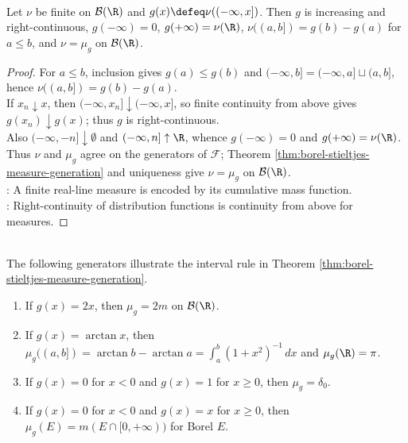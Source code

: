 \begin{proposition} \label{prop:finite-borel-measure-distribution-function} \\
Let $\nu$ be finite on $\mathcal{B}(\R)$ and $g(x)\defeq\nu((-\infty,x])$. Then $g$ is increasing and right-continuous, $g(-\infty)=0$, $g(+\infty)=\nu(\R)$, $\nu((a,b])=g(b)-g(a)$ for $a\leq b$, and $\nu=\mu_g$ on $\mathcal{B}(\R)$.
\begin{proof}
For $a\leq b$, inclusion gives $g(a)\leq g(b)$ and $(-\infty,b]=(-\infty,a]\sqcup(a,b]$, hence $\nu((a,b])=g(b)-g(a)$.\\
If $x_n\downarrow x$, then $(-\infty,x_n]\downarrow(-\infty,x]$, so finite continuity from above gives $g(x_n)\downarrow g(x)$; thus $g$ is right-continuous.\\
Also $(-\infty,-n]\downarrow\emptyset$ and $(-\infty,n]\uparrow\R$, whence $g(-\infty)=0$ and $g(+\infty)=\nu(\R)$.\\
Thus $\nu$ and $\mu_g$ agree on the generators of $\mathcal{F}$; Theorem \ref{thm:borel-stieltjes-measure-generation} and uniqueness give $\nu=\mu_g$ on $\mathcal{B}(\R)$.\\
: A finite real-line measure is encoded by its cumulative mass function.\\
: Right-continuity of distribution functions is continuity from above for measures.
\end{proof}
\end{proposition}

\begin{example} \label{ex:borel-stieltjes-basic-generators} \\
The following generators illustrate the interval rule in Theorem \ref{thm:borel-stieltjes-measure-generation}.
\begin{enumerate}[label=(\roman*)]
\setlength{\itemsep}{0pt}
\item If $g(x)=2x$, then $\mu_g=2m$ on $\mathcal{B}(\R)$.
\item If $g(x)=\arctan x$, then $\mu_g((a,b])=\arctan b-\arctan a=\int_a^b(1+x^2)^{-1}\,dx$ and $\mu_g(\R)=\pi$.
\item If $g(x)=0$ for $x<0$ and $g(x)=1$ for $x\geq0$, then $\mu_g=\delta_0$.
\item If $g(x)=0$ for $x<0$ and $g(x)=x$ for $x\geq0$, then $\mu_g(E)=m(E\cap[0,+\infty))$ for Borel $E$.
\end{enumerate}
\end{example}

